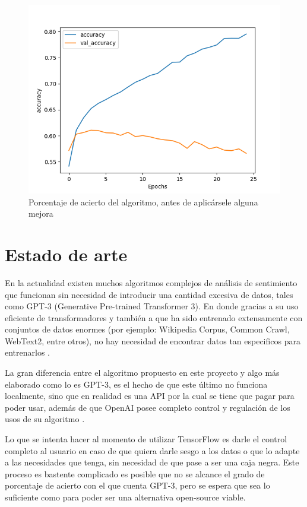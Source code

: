 \documentclass[a4]{sciposter}
\begin{document}
\begin{multicols}{3}
\begin{figure}
	\centering
	\captionsetup{type=figure}
	\setcounter{figure}{0}
	\includegraphics[scale=1.3]{img/Accuracy 2020-05_nofilter}
	\caption{Porcentaje de acierto del algoritmo, antes de aplicársele alguna mejora}
	
\end{figure}

\section{Estado de arte}

En la actualidad existen muchos algoritmos complejos de análisis de sentimiento que funcionan sin necesidad de introducir una cantidad excesiva de datos, tales como GPT-3 (Generative Pre-trained Transformer 3). En donde gracias a su uso eficiente de transformadores y también a que ha sido entrenado extensamente con conjuntos de datos enormes (por ejemplo: Wikipedia Corpus, Common Crawl, WebText2, entre otros), no hay necesidad de encontrar datos tan especificos para entrenarlos \citep{gpt3}.

La gran diferencia entre el algoritmo propuesto en este proyecto y algo más elaborado como lo es GPT-3, es el hecho de que este último no funciona localmente, sino que en realidad es una API por la cual se tiene que pagar para poder usar, además de que OpenAI posee completo control y regulación de los usos de su algoritmo \citep{openai}. 

Lo que se intenta hacer al momento de utilizar TensorFlow es darle el control completo al usuario en caso de que quiera darle sesgo a los datos o que lo adapte a las necesidades que tenga, sin necesidad de que pase a ser una caja negra. Este proceso es bastente complicado es posible que no se alcance el grado de porcentaje de acierto con el que cuenta GPT-3, pero se espera que sea lo suficiente como para poder ser una alternativa open-source viable.




\end{multicols}
\end{document}
